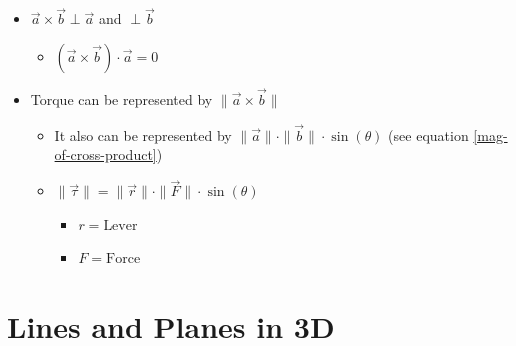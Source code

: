 \documentclass{article}
\begin{document}
\begin{itemize}
\begin{itemize}
  \end{itemize}
  \item $\vec{a}\times\vec{b}\perp\vec{a}$ and $\perp\vec{b}$
  \begin{itemize}
    \item $(\vec{a}\times\vec{b})\cdot\vec{a} = 0$
  \end{itemize}
  \item Torque can be represented by $\|\vec{a}\times\vec{b}\|$
  \begin{itemize}
    \item It also can be represented by $\|\vec{a}\|\cdot\|\vec{b}\|\cdot\sin(\theta)$ (see equation \ref{mag-of-cross-product})
  \item $\|\vec{\tau}\| = \|\vec{r}\|\cdot\|\vec{F}\|\cdot\sin(\theta)$
    \begin{itemize}
      \item $r = \textrm{Lever}$
      \item $F = \textrm{Force}$
    \end{itemize}
  \end{itemize}
\end{itemize}


\section{Lines and Planes in 3D}
\end{document}
